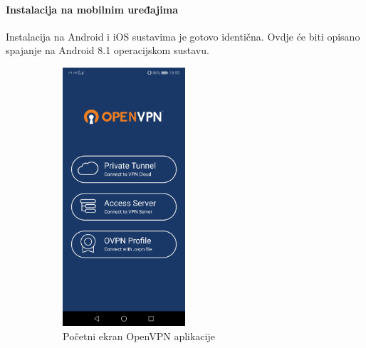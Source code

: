 \paragraph*{Instalacija na mobilnim uređajima}
\hfill \smallbreak
Instalacija na Android i iOS sustavima je gotovo identična. Ovdje će biti opisano spajanje na Android 8.1 operacijskom sustavu.
\begin{figure}[h]
	\centering
	\begin{subfigure}{0.49\textwidth}
		\centering
		\includegraphics[width = 0.5\textwidth]{slike/OpenVPN/Screenshot_20181214-195518}
		\caption{Početni ekran OpenVPN aplikacije}
		\label{fig:screenshot20181214-195518}
	\end{subfigure}
	\begin{subfigure}{0.49\textwidth}
		\centering

\end{subfigure}
\end{figure}
